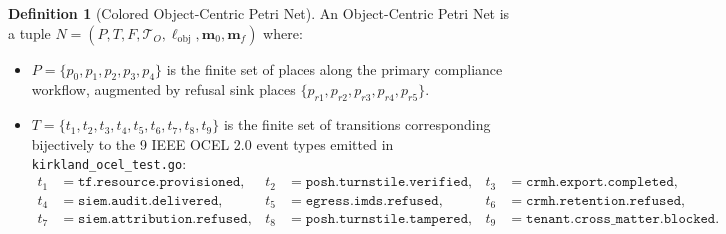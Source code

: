 \documentclass[10pt,twoside,openany]{book}
\theoremstyle{plain}
\theoremstyle{definition}
\newtheorem{definition}[theorem]{Definition}
\theoremstyle{remark}
\begin{document}
\begin{definition}[Colored Object-Centric Petri Net]
An Object-Centric Petri Net is a tuple $N = (P, T, F, \mathcal{T}_O, \ell_{\mathrm{obj}}, \mathbf{m}_0, \mathbf{m}_f)$ where:
\begin{itemize}
    \item $P = \{p_0, p_1, p_2, p_3, p_4\}$ is the finite set of places along the primary compliance workflow, augmented by refusal sink places $\{p_{r1}, p_{r2}, p_{r3}, p_{r4}, p_{r5}\}$.
    \item $T = \{t_1, t_2, t_3, t_4, t_5, t_6, t_7, t_8, t_9\}$ is the finite set of transitions corresponding bijectively to the 9 IEEE OCEL 2.0 event types emitted in \texttt{kirkland\_ocel\_test.go}:
    \begin{align*}
        t_1 &= \mathtt{tf.resource.provisioned}, & t_2 &= \mathtt{posh.turnstile.verified}, & t_3 &= \mathtt{crmh.export.completed}, \\
        t_4 &= \mathtt{siem.audit.delivered}, & t_5 &= \mathtt{egress.imds.refused}, & t_6 &= \mathtt{crmh.retention.refused}, \\
        t_7 &= \mathtt{siem.attribution.refused}, & t_8 &= \mathtt{posh.turnstile.tampered}, & t_9 &= \mathtt{tenant.cross\_matter.blocked}.
    \end{align*}
\end{itemize}
\end{definition}
\end{document}
